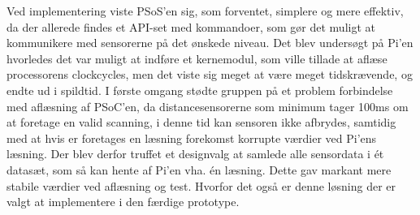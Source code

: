 Ved implementering viste PSoS'en sig, som forventet, simplere og mere effektiv, da der allerede findes et API-set med \IIC kommandoer, som gør det muligt at kommunikere med sensorerne på det ønskede niveau. 
Det blev undersøgt på Pi'en hvorledes det var muligt at indføre et kernemodul, som ville tillade at aflæse processorens clockcycles, men det viste sig meget at være meget tidskrævende, og endte ud i spildtid. 
I første omgang stødte gruppen på et problem forbindelse med aflæsning af PSoC'en, da distancesensorerne som minimum tager 100ms om at foretage en valid scanning, i denne tid kan sensoren ikke afbrydes, samtidig med at hvis er foretages en læsning forekomst korrupte værdier ved Pi'ens læsning. 
Der blev derfor truffet et designvalg at samlede alle sensordata i ét datasæt, som så kan hente af Pi'en vha. én læsning.
Dette gav markant mere stabile værdier ved aflæsning og test. Hvorfor det også er denne løsning der er valgt at implementere i den færdige prototype.